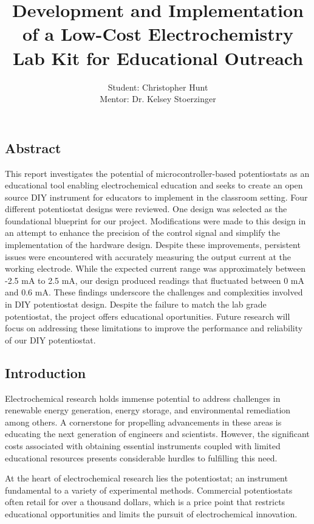 \documentclass{article}
\title{\textcolor{mycolor}{\textbf{{\huge Development and Implementation of a Low-Cost Electrochemistry Lab Kit for Educational Outreach}}}}
\author{Student: Christopher Hunt \\ Mentor: Dr. Kelsey Stoerzinger}
\date{}
\begin{document}
\pagestyle{fancy}
\fancyhf{}
\rfoot{}
\rhead{\thepage}
\maketitle


\subsection*{Abstract}


This report investigates the potential of microcontroller-based potentiostats as an educational tool enabling electrochemical education and seeks to create an open source DIY instrument for educators to implement in the classroom setting. Four different potentiostat designs were reviewed. One design was selected as the foundational blueprint for our project. Modifications were made to this design in an attempt to enhance the precision of the control signal and simplify the implementation of the hardware design. Despite these improvements, persistent issues were encountered with accurately measuring the output current at the working electrode. While the expected current range was approximately between -2.5 mA to 2.5 mA, our design produced readings that fluctuated between 0 mA and 0.6 mA. These findings underscore the challenges and complexities involved in DIY potentiostat design. Despite the failure to match the lab grade potentiostat, the project offers educational oportunities. Future research will focus on addressing these limitations to improve the performance and reliability of our DIY potentiostat.


\subsection*{Introduction}
Electrochemical research holds immense potential to address challenges in renewable energy generation, energy storage, and environmental remediation among others. A cornerstone for propelling advancements in these areas is educating the next generation of engineers and scientists. However, the significant costs associated with obtaining essential instruments coupled with limited educational resources presents considerable hurdles to fulfilling this need.


At the heart of electrochemical research lies the potentiostat; an instrument fundamental to a variety of experimental methods. Commercial potentiostats often retail for over a thousand dollars, which is a price point that restricts educational opportunities and limits the pursuit of electrochemical innovation.
\end{document}
